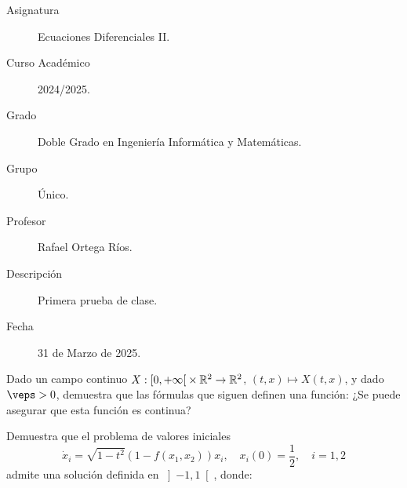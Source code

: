 \documentclass[12pt]{article}
\begin{document}

    
    

    \begin{description}
        \item[Asignatura] Ecuaciones Diferenciales II.
        \item[Curso Académico] 2024/2025.
        \item[Grado] Doble Grado en Ingeniería Informática y Matemáticas.
        \item[Grupo] Único.
        \item[Profesor] Rafael Ortega Ríos.
        \item[Descripción] Primera prueba de clase.
        \item[Fecha] 31 de Marzo de 2025.
    
    \end{description}
    \newpage


    
    \begin{ejercicio}
        Dado un campo continuo $X : \left[0,+\infty\right[ \times \mathbb{R}^2 \to \mathbb{R}^2$, $(t,x) \mapsto X(t,x)$, y dado $\veps > 0$, demuestra que las fórmulas que siguen definen una función:
        \Func{x_\veps}{ \left[0,+\infty\right[}{\bb{R}^2}{t}{
            \begin{cases}
                (0,1), & t \in \left[0, \veps\right],\\
                x_\veps(t-\veps) + \veps X(t-\veps, x_\veps(t-\veps)), & t \in \left]\veps, +\infty\right[.
            \end{cases}
        }
        ¿Se puede asegurar que esta función es continua?
    \end{ejercicio}

    \begin{ejercicio}
        Demuestra que el problema de valores iniciales
        \[
            \dot{x}_i = \sqrt{1-t^2}(1-f(x_1,x_2))x_i, \quad x_i(0) = \frac{1}{2}, \quad i = 1,2
        \]
        admite una solución definida en $\left]-1,1\right[$, donde:
    \end{ejercicio}
\end{document}
